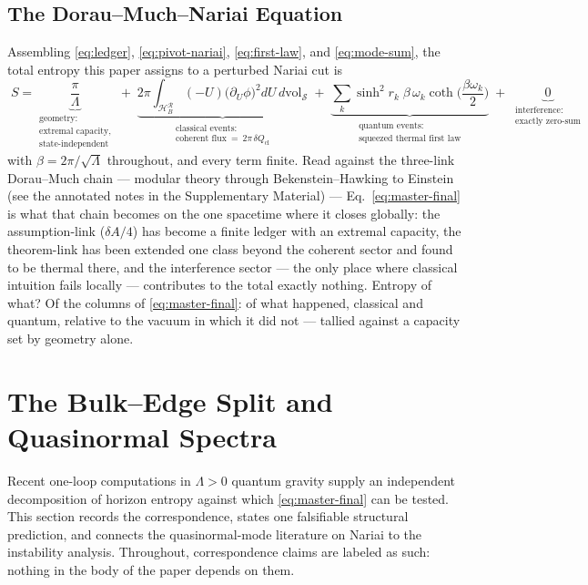 \documentclass[11pt]{article}
\newcommand{\Nariai}{Nariai}
\begin{document}
\subsection{The Dorau--Much--Nariai Equation}
\label{app:master}

Assembling \eqref{eq:ledger}, \eqref{eq:pivot-nariai}, \eqref{eq:first-law}, and \eqref{eq:mode-sum}, the total entropy this paper assigns to a perturbed \Nariai{} cut is
\begin{equation}
\boxed{\;
S
=
\underbrace{\frac{\pi}{\Lambda}}_{\substack{\text{geometry:}\\ \text{extremal capacity,}\\ \text{state-independent}}}
\;+\;
\underbrace{2\pi\!\int_{\mathcal{H}_B^{\mathcal{R}}}\!\!(-U)\big(\partial_U\phi\big)^2 dU\, d\mathrm{vol}_{\mathcal{S}}}_{\substack{\text{classical events:}\\ \text{coherent flux}\ =\ 2\pi\,\delta Q_{\mathrm{cl}}}}
\;+\;
\underbrace{\sum_k \sinh^2\! r_k\;\beta\,\omega_k \coth\!\Big(\frac{\beta\omega_k}{2}\Big)}_{\substack{\text{quantum events:}\\ \text{squeezed thermal first law}}}
\;+\;
\underbrace{\;0\;}_{\substack{\text{interference:}\\ \text{exactly zero-sum}}}
\;}
\label{eq:master-final}
\end{equation}
with $\beta = 2\pi/\sqrt{\Lambda}$ throughout, and every term finite. Read against the three-link Dorau--Much chain --- modular theory through Bekenstein--Hawking to Einstein (see the annotated notes in the Supplementary Material) --- Eq.~\eqref{eq:master-final} is what that chain becomes on the one spacetime where it closes globally: the assumption-link ($\delta A/4$) has become a finite ledger with an extremal capacity, the theorem-link has been extended one class beyond the coherent sector and found to be thermal there, and the interference sector --- the only place where classical intuition fails locally --- contributes to the total exactly nothing. Entropy of what? Of the columns of \eqref{eq:master-final}: of what happened, classical and quantum, relative to the vacuum in which it did not --- tallied against a capacity set by geometry alone.

\section{The Bulk--Edge Split and Quasinormal Spectra}
\label{app:bulkedge}

Recent one-loop computations in $\Lambda > 0$ quantum gravity supply an independent decomposition of horizon entropy against which \eqref{eq:master-final} can be tested. This section records the correspondence, states one falsifiable structural prediction, and connects the quasinormal-mode literature on \Nariai{} to the instability analysis. Throughout, correspondence claims are labeled as such: nothing in the body of the paper depends on them.
\end{document}
